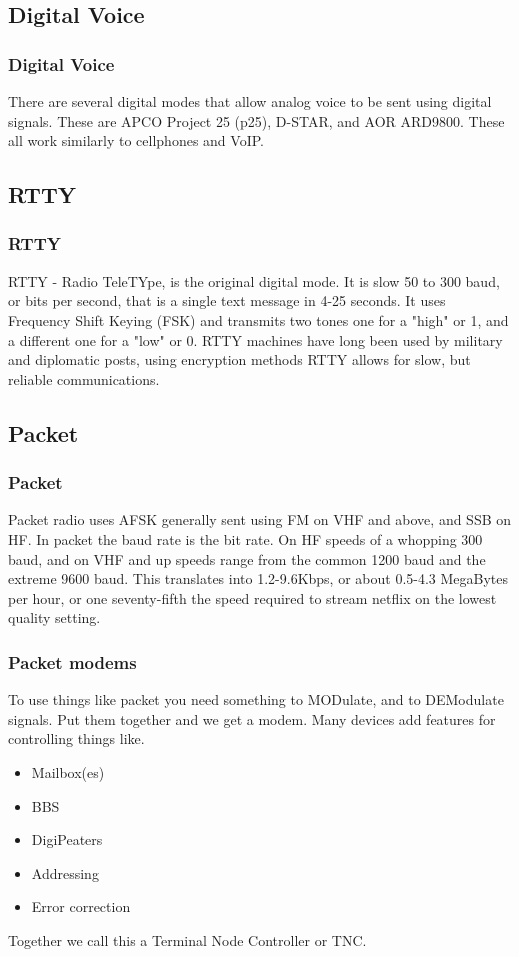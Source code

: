 \documentclass[10pt]{beamer}
\begin{document}
\subsection{Digital Voice}
\begin{frame}
\frametitle{Digital Voice}
There are several digital modes that allow analog voice to be sent using digital signals. These are APCO Project 25 (p25), D-STAR, and AOR ARD9800. These all work similarly to cellphones and VoIP.
\end{frame}

\subsection{RTTY}
\begin{frame}
\frametitle{RTTY}
RTTY - Radio TeleTYpe, is the original digital mode. It is slow 50 to 300 baud, or bits per second, that is a single text message in 4-25 seconds. It uses Frequency Shift Keying (FSK) and transmits two tones one for a "high" or 1, and a different one for a "low" or 0. RTTY machines have long been used by military and diplomatic posts, using encryption methods RTTY allows for slow, but reliable communications.
\end{frame}

\subsection{Packet}
\begin{frame}
\frametitle{Packet}
Packet radio uses AFSK generally sent using FM on VHF and above, and SSB on HF. In packet the baud rate is the bit rate. On HF speeds of a whopping 300 baud, and on VHF and up speeds range from the common 1200 baud and the extreme 9600 baud. This translates into 1.2-9.6Kbps, or about 0.5-4.3 MegaBytes per hour, or one seventy-fifth the speed required to stream netflix on the lowest quality setting.
\end{frame}

\begin{frame}
\frametitle{Packet modems}
To use things like packet you need something to MODulate, and to DEModulate signals. Put them together and we get a modem. Many devices add features for controlling things like.\\
\begin{itemize}
\item Mailbox(es)
\item BBS
\item DigiPeaters
\item Addressing
\item Error correction
\end{itemize}
Together we call this a Terminal Node Controller or TNC.
\end{frame}
\end{document}

